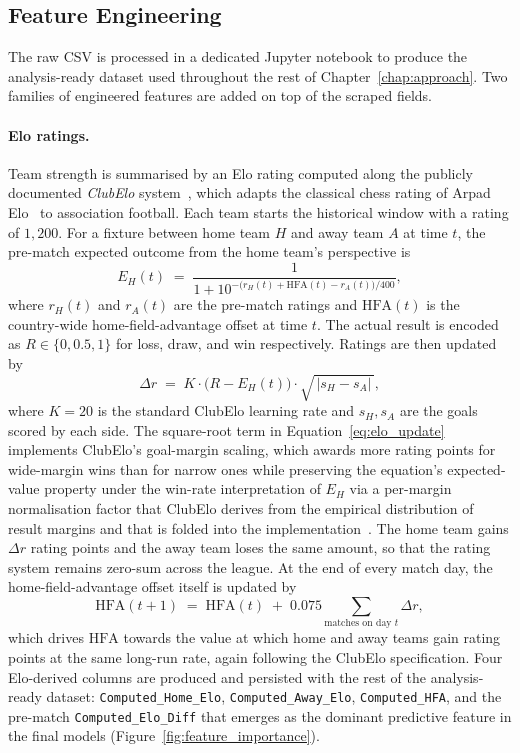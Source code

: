\subsection{Feature Engineering}
\label{subsec:feature_engineering}

The raw CSV is processed in a dedicated Jupyter notebook to produce the analysis-ready dataset used throughout the rest of Chapter~\ref{chap:approach}. Two families of engineered features are added on top of the scraped fields.

\paragraph{Elo ratings.}
Team strength is summarised by an Elo rating computed along the publicly documented \emph{ClubElo} system~\cite{clubelo}, which adapts the classical chess rating of Arpad Elo~\cite{elo1978rating} to association football. Each team starts the historical window with a rating of $1{,}200$. For a fixture between home team $H$ and away team $A$ at time $t$, the pre-match expected outcome from the home team's perspective is
\begin{equation}
    E_H(t) \;=\; \frac{1}{1 + 10^{-\bigl(r_H(t) + \mathrm{HFA}(t) - r_A(t)\bigr)/400}},
    \label{eq:elo_expected}
\end{equation}
where $r_H(t)$ and $r_A(t)$ are the pre-match ratings and $\mathrm{HFA}(t)$ is the country-wide home-field-advantage offset at time $t$. The actual result is encoded as $R \in \{0, 0.5, 1\}$ for loss, draw, and win respectively. Ratings are then updated by
\begin{equation}
    \Delta r \;=\; K \cdot \bigl(R - E_H(t)\bigr) \cdot \sqrt{\,|s_H - s_A|\,},
    \label{eq:elo_update}
\end{equation}
where $K = 20$ is the standard ClubElo learning rate and $s_H, s_A$ are the goals scored by each side. The square-root term in Equation~\eqref{eq:elo_update} implements ClubElo's goal-margin scaling, which awards more rating points for wide-margin wins than for narrow ones while preserving the equation's expected-value property under the win-rate interpretation of $E_H$ via a per-margin normalisation factor that ClubElo derives from the empirical distribution of result margins and that is folded into the implementation~\cite{clubelo}. The home team gains $\Delta r$ rating points and the away team loses the same amount, so that the rating system remains zero-sum across the league. At the end of every match day, the home-field-advantage offset itself is updated by
\begin{equation}
    \mathrm{HFA}(t+1) \;=\; \mathrm{HFA}(t) \;+\; 0.075 \sum_{\text{matches on day } t} \Delta r,
    \label{eq:hfa_update}
\end{equation}
which drives $\mathrm{HFA}$ towards the value at which home and away teams gain rating points at the same long-run rate, again following the ClubElo specification. Four Elo-derived columns are produced and persisted with the rest of the analysis-ready dataset: \texttt{Computed\_Home\_Elo}, \texttt{Computed\_Away\_Elo}, \texttt{Computed\_HFA}, and the pre-match \texttt{Computed\_Elo\_Diff} that emerges as the dominant predictive feature in the final models (Figure~\ref{fig:feature_importance}).

